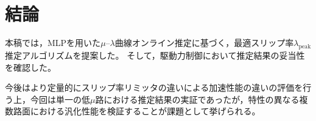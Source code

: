 \documentclass[dvipdfmx,usejistfm]{ieej-tec2}
\begin{document}
\section{結論}
本稿では，MLPを用いた$\mu$--$\lambda$曲線オンライン推定に基づく，最適スリップ率$\lambda_\mathrm{peak}$推定アルゴリズムを提案した。
そして，駆動力制御において推定結果の妥当性を確認した。

今後はより定量的にスリップ率リミッタの違いによる加速性能の違いの評価を行う上，今回は単一の低$\mu$路における推定結果の実証であったが，特性の異なる複数路面における汎化性能を検証することが課題として挙げられる。






\end{document}
